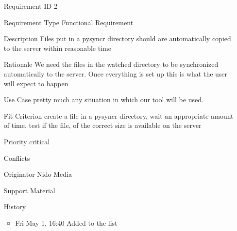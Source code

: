 \documentclass{article}
\begin{document}
\begin{itemize}
  \item[Requirement ID] 2
  \item[Requirement Type] Functional Requirement
  \item[Description] Files put in a pysyncr directory should are
  automatically copied to the server within reasonable time
  \item[Rationale] We need the files in the watched directory to be
  synchronized automatically to the server. Once everything is set up
  this is what the user will expect to happen
  \item[Use Case] pretty much any situation in which our tool will be
  used.
  \item[Fit Criterion] create a file in a pysyncr directory, wait an
  appropriate amount of time, test if the file, of the correct size is
  available on the server
  \item[Priority] critical
  \item[Conflicts] 
  \item[Originator] Nido Media
  \item[Support Material]
  \item[History] 
  \begin{itemize}
    \item Fri May 1, 16:40 Added to the list
  \end{itemize}
\end{itemize}
\end{document}
